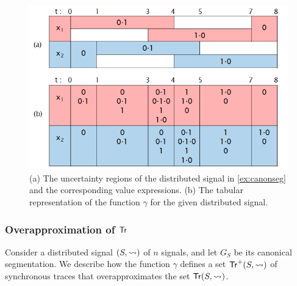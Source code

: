 \begin{figure} 
	\centering
	\includegraphics[scale=0.45]{valexpr.png}
	\caption{(a) The uncertainty regions of the distributed signal in \cref{ex:canonseg} and the corresponding value expressions. (b) The tabular representation of the function $\gamma$ for the given distributed signal.}
	\label{fig:valexpr}
\end{figure}

\subsubsection{Overapproximation of $\mathsf{Tr}$}
Consider a distributed signal $(S,{\rightsquigarrow})$ of $n$ signals, and let $G_S$ be its canonical segmentation.
We describe how the function $\gamma$ defines a set $\mathsf{Tr}^+(S,{\rightsquigarrow})$ of synchronous traces that overapproximates the set $\mathsf{Tr}(S,{\rightsquigarrow})$.



